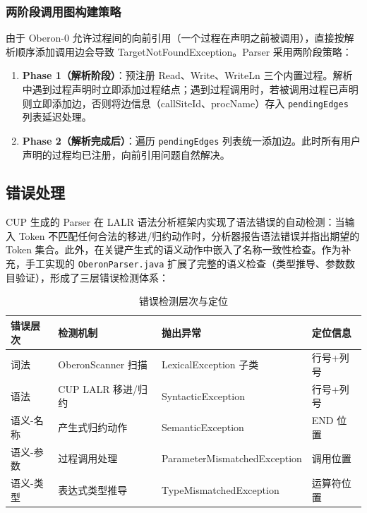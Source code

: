 \subsubsection{两阶段调用图构建策略}

由于 Oberon-0 允许过程间的向前引用（一个过程在声明之前被调用），直接按解析顺序添加调用边会导致 TargetNotFoundException。Parser 采用两阶段策略：

\begin{enumerate}
    \item \textbf{Phase 1（解析阶段）}：预注册 Read、Write、WriteLn 三个内置过程。解析中遇到过程声明时立即添加过程结点；遇到过程调用时，若被调用过程已声明则立即添加边，否则将边信息（callSiteId、procName）存入 \texttt{pendingEdges} 列表延迟处理。
    \item \textbf{Phase 2（解析完成后）}：遍历 \texttt{pendingEdges} 列表统一添加边。此时所有用户声明的过程均已注册，向前引用问题自然解决。
\end{enumerate}

\subsection{错误处理}

CUP 生成的 Parser 在 LALR 语法分析框架内实现了语法错误的自动检测：当输入 Token 不匹配任何合法的移进/归约动作时，分析器报告语法错误并指出期望的 Token 集合。此外，在关键产生式的语义动作中嵌入了名称一致性检查。作为补充，手工实现的 \texttt{OberonParser.java} 扩展了完整的语义检查（类型推导、参数数目验证），形成了三层错误检测体系：

\begin{table}[htbp]
    \centering\small
    \begin{tabular}{|p{1.8cm}|p{3.8cm}|p{4.5cm}|p{2.8cm}|}
    \hline
    \textbf{错误层次} & \textbf{检测机制} & \textbf{抛出异常} & \textbf{定位信息} \\
    \hline
    词法 & OberonScanner 扫描 & LexicalException 子类 & 行号+列号 \\
    语法 & CUP LALR 移进/归约 & SyntacticException & 行号+列号 \\
    语义-名称 & 产生式归约动作 & SemanticException & END 位置 \\
    语义-参数 & 过程调用处理 & Parameter\-Mismatched\-Exception & 调用位置 \\
    语义-类型 & 表达式类型推导 & Type\-Mismatched\-Exception & 运算符位置 \\
    \hline
    \end{tabular}
    \caption{错误检测层次与定位}
    \label{tab:error-levels}
\end{table}


